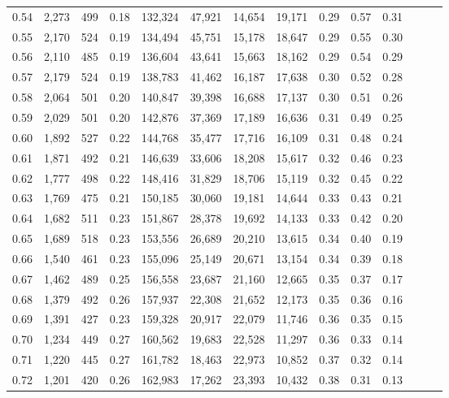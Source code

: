\begin{tabular}{rrrrrrrrrrrrrr}
0.54 &  2,273 &    499 &  0.18 &  132,324 &   47,921 &  14,654 &  19,171 &  0.29 &  0.57 &      0.31 \\
0.55 &  2,170 &    524 &  0.19 &  134,494 &   45,751 &  15,178 &  18,647 &  0.29 &  0.55 &      0.30 \\
0.56 &  2,110 &    485 &  0.19 &  136,604 &   43,641 &  15,663 &  18,162 &  0.29 &  0.54 &      0.29 \\
0.57 &  2,179 &    524 &  0.19 &  138,783 &   41,462 &  16,187 &  17,638 &  0.30 &  0.52 &      0.28 \\
0.58 &  2,064 &    501 &  0.20 &  140,847 &   39,398 &  16,688 &  17,137 &  0.30 &  0.51 &      0.26 \\
0.59 &  2,029 &    501 &  0.20 &  142,876 &   37,369 &  17,189 &  16,636 &  0.31 &  0.49 &      0.25 \\
0.60 &  1,892 &    527 &  0.22 &  144,768 &   35,477 &  17,716 &  16,109 &  0.31 &  0.48 &      0.24 \\
0.61 &  1,871 &    492 &  0.21 &  146,639 &   33,606 &  18,208 &  15,617 &  0.32 &  0.46 &      0.23 \\
0.62 &  1,777 &    498 &  0.22 &  148,416 &   31,829 &  18,706 &  15,119 &  0.32 &  0.45 &      0.22 \\
0.63 &  1,769 &    475 &  0.21 &  150,185 &   30,060 &  19,181 &  14,644 &  0.33 &  0.43 &      0.21 \\
0.64 &  1,682 &    511 &  0.23 &  151,867 &   28,378 &  19,692 &  14,133 &  0.33 &  0.42 &      0.20 \\
0.65 &  1,689 &    518 &  0.23 &  153,556 &   26,689 &  20,210 &  13,615 &  0.34 &  0.40 &      0.19 \\
0.66 &  1,540 &    461 &  0.23 &  155,096 &   25,149 &  20,671 &  13,154 &  0.34 &  0.39 &      0.18 \\
0.67 &  1,462 &    489 &  0.25 &  156,558 &   23,687 &  21,160 &  12,665 &  0.35 &  0.37 &      0.17 \\
0.68 &  1,379 &    492 &  0.26 &  157,937 &   22,308 &  21,652 &  12,173 &  0.35 &  0.36 &      0.16 \\
0.69 &  1,391 &    427 &  0.23 &  159,328 &   20,917 &  22,079 &  11,746 &  0.36 &  0.35 &      0.15 \\
0.70 &  1,234 &    449 &  0.27 &  160,562 &   19,683 &  22,528 &  11,297 &  0.36 &  0.33 &      0.14 \\
0.71 &  1,220 &    445 &  0.27 &  161,782 &   18,463 &  22,973 &  10,852 &  0.37 &  0.32 &      0.14 \\
0.72 &  1,201 &    420 &  0.26 &  162,983 &   17,262 &  23,393 &  10,432 &  0.38 &  0.31 &      0.13 \\

\end{tabular}
